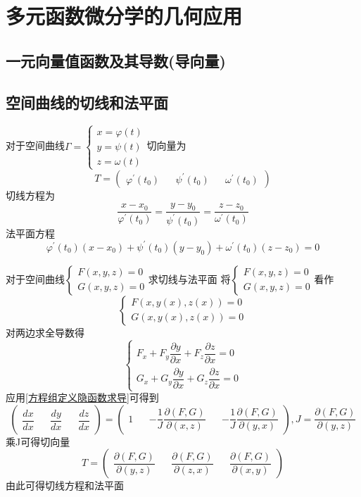 \documentclass[main.tex]{subfiles}
\begin{document}
\section{多元函数微分学的几何应用}
\subsection{一元向量值函数及其导数(导向量)}
\subsection{空间曲线的切线和法平面}\label{空间曲线的切线和法平面}
对于空间曲线$\Gamma = \begin{cases} x = \varphi (t) \\ y = \psi (t) \\ z = \omega (t) \end{cases}$切向量为
\[
    T = \begin{pmatrix} \varphi^{'} (t_0) && \psi^{'} (t_0) && \omega^{'} (t_0) \end{pmatrix}
\]
切线方程为
\[
    \frac{x - x_0}{\varphi^{'} (t_0)} = \frac{y - y_0}{\psi^{'} (t_0)} = \frac{z - z_0}{\omega^{'} (t_0)}
\]
法平面方程
\[
    {\varphi^{'} (t_0)}({x - x_0}) + {\psi^{'} (t_0)}({y - y_0}) + {\omega^{'} (t_0)}({z - z_0}) = 0
\]
\begin{example}
    {对于空间曲线$\begin{cases} F(x, y, z) = 0 \\ G(x, y, z) = 0 \end{cases}$求切线与法平面}
    将$\begin{cases} F(x, y, z) = 0 \\ G(x, y, z) = 0 \end{cases}$看作
    \[\begin{cases} F(x, y(x), z(x)) = 0 \\ G(x, y(x), z(x)) = 0 \end{cases}\]
    对两边求全导数得
    \[\begin{cases}F_x  + F_y \dfrac{\partial y}{\partial x} + F_z \dfrac{\partial z}{\partial x} = 0 \\[8pt] G_x  + G_y \dfrac{\partial y}{\partial x} + G_z \dfrac{\partial z}{\partial x} = 0\end{cases}\]
    应用\ref{方程组定义隐函数求导}可得到
    \[\begin{pmatrix}\dfrac{dx}{dx} && \dfrac{dy}{dx} && \dfrac{dz}{dx}\end{pmatrix} = \begin{pmatrix} 1 && -\dfrac{1}{J}\dfrac{\partial(F, G)}{\partial(x, z)} && -\dfrac{1}{J}\dfrac{\partial(F, G)}{\partial(y, x)} \end{pmatrix}, J = \frac{\partial(F, G)}{\partial(y, z)}\]
    乘J可得切向量
    \[T = \begin{pmatrix} \dfrac{\partial(F, G)}{\partial(y, z)} && \dfrac{\partial(F, G)}{\partial(z, x)} && \dfrac{\partial(F, G)}{\partial(x, y)} \end{pmatrix}\]
    由此可得切线方程和法平面
\end{example}
\end{document}

